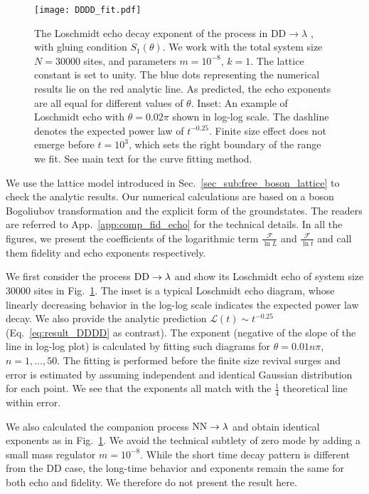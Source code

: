 \begin{figure}[h]
\texttt{[image: DDDD\_fit.pdf]}
\caption{The Loschmidt echo decay exponent of the process in $\text{DD}\rightarrow \lambda$ {\iffalse \color{red}Eq.~\eqref{eq:DDDD}\fi}, with gluing condition $S_1(\theta)$. We work with the total system size $N = 30000$ sites, and parameters $m = 10^{-8}$, $k = 1$. The lattice constant is set to unity. The blue dots representing the numerical results lie on the red analytic line. As predicted, the echo exponents are all equal for different values of $\theta$. Inset: An example of Loschmidt echo with $\theta = 0.02 \pi$ shown in log-log scale. The dashline denotes the expected power law of $t^{-0.25}$. Finite size effect does not emerge before $t=10^{3}$, which sets the right boundary of the range we fit. See main text for the curve fitting method.}
\label{fig:DDDD}
\end{figure}

We use the lattice model introduced in Sec.~\ref{sec_sub:free_boson_lattice} to check the analytic results. Our numerical calculations are based on a boson Bogoliubov transformation and the explicit form of the groundstates. The readers are referred to App.~\ref{app:comp_fid_echo} for the technical details. In all the figures, we present the coefficients of the logarithmic term $\frac{\mathcal{F}}{\ln L}$ and $\frac{\mathcal{F} }{\ln t}$ and call them fidelity and echo exponents respectively. 

We first consider the process ${\rm DD} \rightarrow \lambda$
and show its Loschmidt echo of system size 30000 sites in Fig.~\ref{fig:DDDD}. The inset is a typical Loschmidt echo diagram, whose linearly decreasing behavior in the log-log scale indicates the expected power law decay. We also provide the analytic prediction $\mathcal{L}(t)\sim t^{-0.25}$ (\cf Eq.~\eqref{eq:result_DDDD} as contrast). The exponent (negative of the slope of the line in log-log plot) is calculated by fitting such diagrams for $\theta = 0.01n \pi$, $n = 1,...,50 $. The fitting is performed before the finite size revival surges and error is estimated by assuming independent and identical Gaussian distribution for each point. We see that the exponents all match with the $\frac{1}{4}$ theoretical line within error. 

We also calculated the companion process ${\rm NN} \rightarrow \lambda$ and obtain identical exponents as in Fig.~\ref{fig:DDDD}. We avoid the technical subtlety of zero mode by adding a small mass regulator $m=10^{-8}$. While the short time decay pattern is different from the DD case, the long-time behavior and exponents remain the same for both echo and fidelity. We therefore do not present the result here. 


